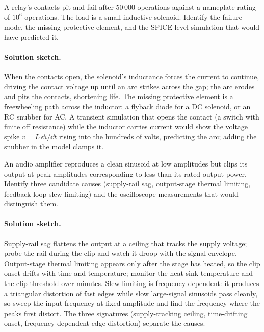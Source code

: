 \begin{exercise}
A relay's contacts pit and fail after $50\,000$ operations against a
nameplate rating of $10^{6}$ operations. The load is a small
inductive solenoid. Identify the failure mode, the missing protective
element, and the SPICE-level simulation that would have predicted
it.
\paragraph{Solution sketch.}
When the contacts open, the solenoid's inductance forces the current to
continue, driving the contact voltage up until an arc strikes across
the gap; the arc erodes and pits the contacts, shortening life. The
missing protective element is a freewheeling path across the inductor: a
flyback diode for a DC solenoid, or an RC snubber for AC. A transient
simulation that opens the contact (a switch with finite off
resistance) while the inductor carries current would show the voltage
spike $v = L\,\dd i/\dd t$ rising into the hundreds of volts, predicting
the arc; adding the snubber in the model clamps it.
\end{exercise}

\begin{exercise}
An audio amplifier reproduces a clean sinusoid at low amplitudes but
clips its output at peak amplitudes corresponding to less than its
rated output power. Identify three candidate causes (supply-rail
sag, output-stage thermal limiting, feedback-loop slew limiting) and
the oscilloscope measurements that would distinguish them.
\paragraph{Solution sketch.}
Supply-rail sag flattens the output at a ceiling that tracks the supply
voltage; probe the rail during the clip and watch it droop with the
signal envelope. Output-stage thermal limiting appears only after the
stage has heated, so the clip onset drifts with time and temperature;
monitor the heat-sink temperature and the clip threshold over minutes.
Slew limiting is frequency-dependent: it produces a triangular distortion
of fast edges while slow large-signal sinusoids pass cleanly, so sweep
the input frequency at fixed amplitude and find the frequency where the
peaks first distort. The three signatures (supply-tracking ceiling,
time-drifting onset, frequency-dependent edge distortion) separate the
causes.
\end{exercise}

